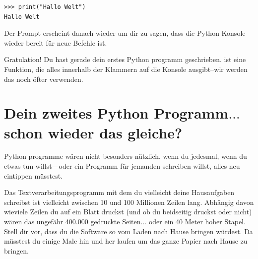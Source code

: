 \begin{Verbatim}[frame=single]
>>> print("Hallo Welt")
Hallo Welt
\end{Verbatim}

Der Prompt erscheint danach wieder um dir zu sagen, dass die Python Konsole wieder bereit für neue Befehle ist.

\noindent
Gratulation! Du hast gerade dein erstes Python programm geschrieben.  ist eine Funktion, die alles innerhalb der Klammern auf die Konsole ausgibt--wir werden das noch öfter verwenden.

\section{Dein zweites Python Programm$\ldots$schon wieder das gleiche?}

Python programme wären nicht besonders nützlich, wenn du jedesmal, wenn du etwas tun willst---oder ein Programm für jemanden schreiben willst, alles neu eintippen müsstest.

Das Textverarbeitungsprogramm mit dem du vielleicht deine Hausaufgaben schreibst ist vielleicht zwischen 10 und 100 Millionen Zeilen lang. Abhängig davon wieviele Zeilen du auf ein Blatt druckst (und ob du beidseitig druckst oder nicht) wären das ungefähr 400.000 gedruckte Seiten$\ldots$ oder ein 40 Meter hoher Stapel.
Stell dir vor, dass du die Software so vom Laden nach Hause bringen würdest. Da müsstest du einige Male hin und her laufen um das ganze Papier nach Hause zu bringen.

